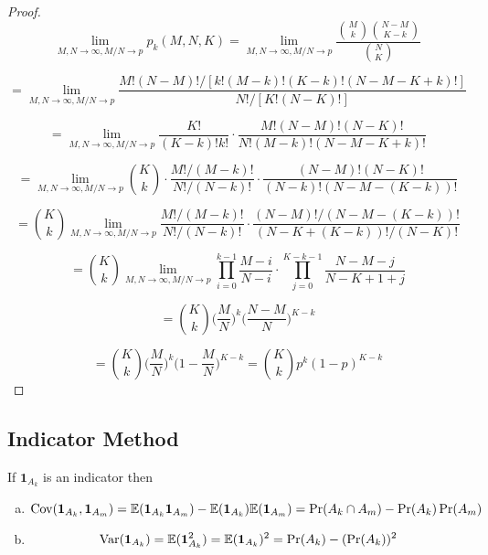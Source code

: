 \begin{proof}
\[
\lim_{M, N \to \infty, M/N \to p} p_k(M, N, K) = \lim_{M, N \to \infty, M/N \to p} \frac{\binom{M}{k} \binom{N-M}{K-k}}{\binom{N}{K}}
\]

\[
= \lim_{M, N \to \infty, M/N \to p} \frac{M!(N-M)!/[k!(M-k)!(K-k)!(N-M-K+k)!]}{N!/[K!(N-K)!]}
\]

\[
= \lim_{M, N \to \infty, M/N \to p} \frac{K!}{(K-k)!k!}\cdot \frac{M!(N-M)!(N-K)!}{N!(M-k)!(N-M-K+k)!}
\]



\[
= \lim_{M, N \to \infty, M/N \to p} \binom{K}{k}\cdot \frac{M!/ (M-k)!}{N!/(N-k)!} \cdot \frac{ (N-M)!(N-K)!}{(N-k)! (N-M-(K-k))!}
\]

\[
= \binom{K}{k} \lim_{M, N \to \infty, M/N \to p} \frac{M!/ (M-k)!}{N!/(N-k)!} \cdot \frac{ (N-M)!/  (N-M-(K-k))!}{(N-K+(K-k))!/(N-K)!}
\]

\[
= \binom{K}{k} \lim_{M, N \to \infty, M/N \to p}\prod_{i=0}^{k-1} \frac{M-i}{N-i} \cdot \prod_{j=0}^{K-k-1} \frac{N-M-j}{N-K+1+j}
\]


\[
= \binom{K}{k} \bigg(\frac{M}{N} \bigg)^k \bigg(\frac{N - M}{N} \bigg)^{K-k}
\]

\[
= \binom{K}{k} \bigg(\frac{M}{N} \bigg)^k \bigg(1 - \frac{M}{N} \bigg)^{K-k}=  \binom{K}{k}p^k(1-p)^{K-k} 
\]
\end{proof}


\subsection{Indicator Method}

\begin{proposition} If \(\boldsymbol{1}_{A_k}\) is an indicator then

\begin{enumerate}[(a)]

\item

\[
\mathrm{Cov}(\boldsymbol{1}_{A_k}, \boldsymbol{1}_{A_m}) = \mathbb{E}(\boldsymbol{1}_{A_k} \boldsymbol{1}_{A_m}) - \mathbb{E}(\boldsymbol{1}_{A_k}) \mathbb{E}(\boldsymbol{1}_{A_m}) = \Pr(A_k \cap A_m) - \Pr(A_k) \Pr(A_m)
\]

\item

\[
\mathrm{Var}(\boldsymbol{1}_{A_k} ) = \mathbb{E}(\boldsymbol{1}_{A_k} ^2) = \mathbb{E}(\boldsymbol{1}_{A_k} )^2 = \Pr(A_k) - (\Pr(A_k))^2
\]

\end{enumerate}
\end{proposition}

